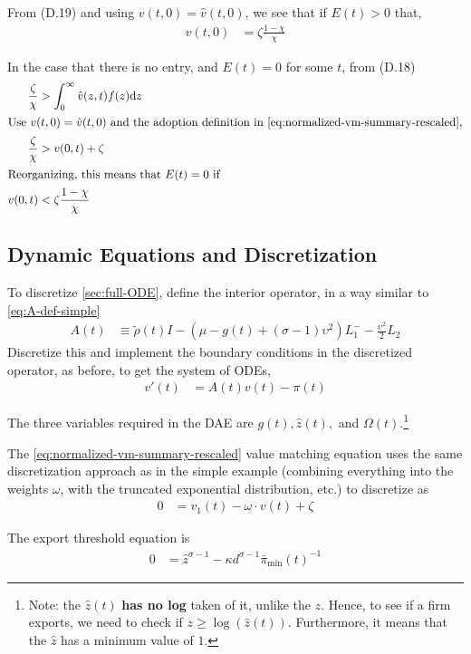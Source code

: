 \documentclass[11pt]{article}
\newcommand{\diff}{\ensuremath{\mathrm{d}}}
\begin{document}
From (D.19) and using $v(t,0) = \hat{v}(t,0)$, we see that if $E(t) > 0$ that,
\begin{align}
v(t,0) &= \zeta \frac{1-\chi}{\chi}
\end{align}

In the case that there is no entry, and $E(t) = 0$ for some $t$, from (D.18)
\begin{align}
\frac{\zeta}{\chi} &> \int_{0}^{\infty}\hat{v}(z,t) f(z) \diff z\\
\intertext{Use $v(t,0) = \hat{v}(t,0)$ and the adoption definition in \cref{eq:normalized-vm-summary-rescaled},}
\frac{\zeta}{\chi}&> v(0,t) + \zeta\\
\intertext{Reorganizing, this means that $E(t) = 0$ if}
v(0,t) &< \zeta \frac{1-\chi}{\chi}
\end{align}


\subsection{Dynamic Equations and Discretization}
To discretize \cref{sec:full-ODE}, define the interior operator, in a way similar to \cref{eq:A-def-simple}
\begin{align}
	A(t) &\equiv \tilde{\rho}(t) I - (\mu - g(t) + (\sigma - 1)\upsilon^2) L^{-}_1 - \frac{\upsilon^2}{2} L_2\label{eq:A-def-full}
	\end{align}
Discretize this and implement the boundary conditions in the discretized operator, as before, to get the system of ODEs,
\begin{align}
	v'(t) &= A(t) v(t) - \pi(t)
\end{align}	

The three variables required in the DAE are $g(t), \hat{z}(t),$ and $\Omega(t)$.\footnote{Note: the $\hat{z}(t)$ \textbf{has no log} taken of it, unlike the $z$.  Hence, to see if a firm exports, we need to check if $z \geq \log(\hat{z}(t))$.  Furthermore, it means that the $\hat{z}$ has a minimum value of $1$.}

The \cref{eq:normalized-vm-summary-rescaled} value matching equation uses the same discretization approach as in the simple example (combining everything into the weights $\omega$, with the truncated exponential distribution, etc.) to discretize as
\begin{align}
	0 &= v_1(t) - \omega \cdot v(t) + \zeta
\end{align}

The export threshold equation is
\begin{align}
	0&=\hat{z}^{\sigma-1}-  \kappa d^{\sigma - 1} \bar{\pi}_{\min}(t)^{-1}\label{eq:z-hat-power}
\end{align}
\end{document}
